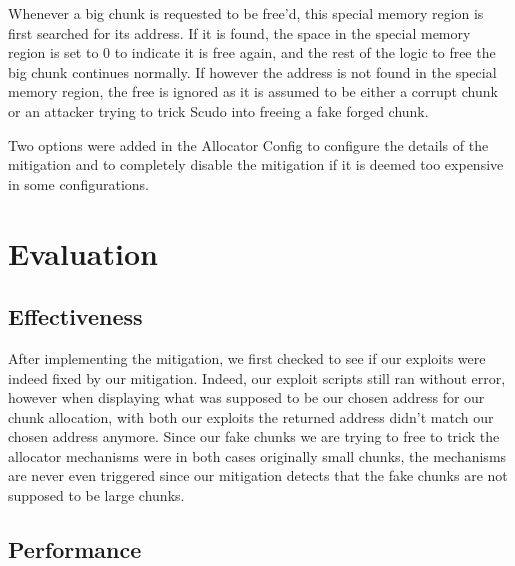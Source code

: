 \documentclass[a4paper,11pt,oneside]{report}
\begin{document}
Whenever a big chunk is requested to be free'd, this special memory region is first
searched for its address. If it is found, the space in the special memory region is set to
0 to indicate it is free again, and the rest of the logic to free the big chunk continues
normally. If however the address is not found in the special memory region, the free is
ignored as it is assumed to be either a corrupt chunk or an attacker trying to trick Scudo
into freeing a fake forged chunk. 

Two options were added in the Allocator Config to configure the details of the mitigation
and to completely disable the mitigation if it is deemed too expensive in some
configurations.

\section{Evaluation}

\subsection{Effectiveness}

After implementing the mitigation, we first checked to see if our exploits were indeed
fixed by our mitigation. Indeed, our exploit scripts still ran without error, however when
displaying what was supposed to be our chosen address for our chunk allocation, with both
our exploits the returned address didn't match our chosen address anymore. Since our fake
chunks we are trying to free to trick the allocator mechanisms were in both cases
originally small chunks, the mechanisms are never even triggered since our mitigation
detects that the fake chunks are not supposed to be large chunks.

\subsection{Performance}
\end{document}
